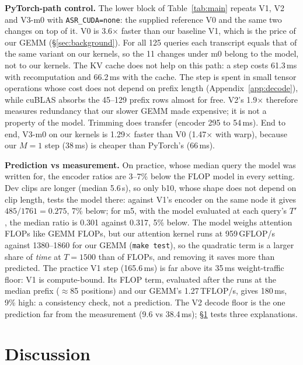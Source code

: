 \documentclass{article}
\begin{document}
\textbf{PyTorch-path control.} The lower block of Table~\ref{tab:main} repeats V1, V2
and V3-m0 with \texttt{ASR\_CUDA=none}: the supplied reference V0 and the same two
changes on top of it. V0 is 3.6$\times$ faster than our baseline V1, which is the price
of our GEMM (\S\ref{sec:background}). For all 125 queries each transcript equals that of
the same variant on our kernels, so the 11 changes under m0 belong to the model, not to
our kernels. The KV cache does not help on this path: a step costs 61.3\,ms with
recomputation and 66.2\,ms with the cache. The step is spent in small tensor operations whose cost does not depend on prefix
length (Appendix~\ref{app:decode}),
while cuBLAS absorbs the 45--129 prefix rows almost for free. V2's 1.9$\times$ therefore measures redundancy that our
slower GEMM made expensive; it is not a property of the model. Trimming does transfer
(encoder 295 to 54\,ms). End to end, V3-m0 on our kernels is 1.29$\times$ faster than V0 (1.47$\times$ with
warp), because our $M=1$ step (38\,ms) is cheaper than PyTorch's (66\,ms).

\textbf{Prediction vs measurement.} On practice, whose median query the model was
written for, the encoder ratios are 3--7\% below the FLOP model in every setting. Dev
clips are longer (median 5.6\,s), so only b10, whose shape does not depend on clip
length, tests the model there: against V1's encoder on the same node it gives
$485/1761 = 0.275$, 7\% below; for m5, with the model evaluated at each query's $T'$,
the median ratio is 0.301 against 0.317, 5\% below. The model weighs attention FLOPs like GEMM FLOPs, but our
attention kernel runs at 959\,GFLOP/s against 1380--1860 for our GEMM
(\texttt{make test}), so the quadratic term is a larger share of \emph{time} at
$T=1500$ than of FLOPs, and removing it saves more than predicted. The practice V1 step (165.6\,ms) is far above its 35\,ms weight-traffic floor: V1 is
compute-bound. Its FLOP term, evaluated after the runs at the median prefix
($\approx$85 positions) and our GEMM's 1.27\,TFLOP/s, gives 180\,ms, 9\% high: a
consistency check, not a prediction. The V2 decode floor is the one prediction far from
the measurement (9.6 vs 38.4\,ms); \S\ref{sec:discussion} tests three explanations.

\section{Discussion}
\label{sec:discussion}
\end{document}
